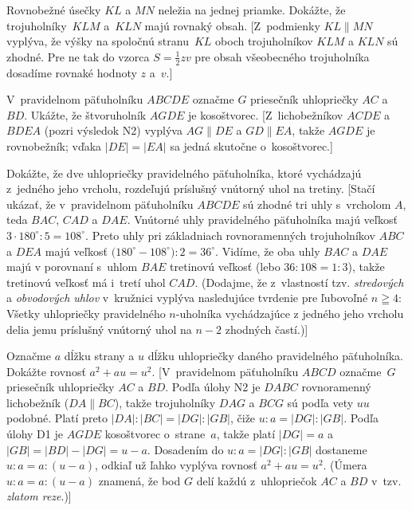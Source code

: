{Rovnobežné úsečky $KL$ a $MN$ neležia na jednej priamke.
Dokážte, že trojuholníky~$KLM$ a~$KLN$ majú rovnaký obsah.
[Z~podmienky $KL\parallel MN$ vyplýva, že výšky na spoločnú
stranu~$KL$ oboch trojuholníkov $KLM$ a $KLN$ sú zhodné.
Pre ne tak do vzorca $S=\frac12 zv$ pre obsah všeobecného trojuholníka
dosadíme rovnaké hodnoty $z$ a~$v$.]

\D
V~pravidelnom päťuholníku $ABCDE$ označme $G$ priesečník
uhlopriečky $AC$ a $BD$. Ukážte, že štvoruholník $AGDE$ je
kosoštvorec.
[Z~lichobežníkov $ACDE$ a $BDEA$ (pozri výsledok N2) vyplýva
$AG\parallel DE$ a $GD\parallel EA$, takže $AGDE$ je rovnobežník;
vďaka $|DE|=|EA|$ sa jedná skutočne o~kosoštvorec.]

Dokážte, že dve uhlopriečky pravidelného päťuholníka, ktoré
vychádzajú z~jedného jeho vrcholu, rozdeľujú príslušný vnútorný uhol
na tretiny.
[Stačí ukázať, že v~pravidelnom päťuholníku $ABCDE$ sú zhodné
tri uhly s~vrcholom $A$, teda $BAC$, $CAD$ a $DAE$.
Vnútorné uhly pravidelného päťuholníka majú veľkosť
$3\cdot180^{\circ}:5=108^{\circ}$. Preto uhly pri základniach
rovnoramenných trojuholníkov $ABC$ a $DEA$ majú veľkosť
${\bigl(180^{\circ}-108^{\circ}\bigr):2}=36^\circ$. Vidíme, že oba uhly
$BAC$ a $DAE$ majú v porovnaní s~uhlom $BAE$ tretinovú veľkosť
(lebo $36:108=1:3$), takže tretinovú veľkosť má i~tretí uhol
$CAD$. (Dodajme, že z~vlastností tzv. {\it stredových\/} a
{\it obvodových uhlov\/} v~kružnici vyplýva nasledujúce tvrdenie
pre ľubovoľné $n\geqq4$:
Všetky uhlopriečky pravidelného $n$-uholníka
vychádzajúce z jedného jeho vrcholu delia jemu príslušný vnútorný uhol
na $n-2$ zhodných častí.)]

Označme $a$ dĺžku strany a $u$ dĺžku uhlopriečky daného
pravidelného päťuholníka. Dokážte rovnosť $a^2+au=u^2$.
[V~pravidelnom päťuholníku $ABCD$ označme~$G$ priesečník
uhlopriečky $AC$ a $BD$. Podľa úlohy N2 je $DABC$ rovnoramenný
lichobežník ($DA\parallel BC$), takže trojuholníky $DAG$ a $BCG$ sú
podľa vety $uu$ podobné. Platí preto $|DA|:|BC|={|DG|:|GB|}$, čiže
$u:a=|DG|:|GB|$. Podľa úlohy D1 je $AGDE$ kosoštvorec o~strane~$a$, takže platí $|DG|=a$ a $|GB|=|BD|-|DG|=u-a$. Dosadením do
$u:a=|DG|:|GB|$ dostaneme $u:a=a:(u-a)$, odkiaľ už ľahko vyplýva
rovnosť $a^2+au=u^2$. (Úmera $u:a=a:(u-a)$ znamená, že bod $G$ delí
každú z~uhlopriečok $AC$ a $BD$ v~tzv. {\it zlatom reze}.)]

}


